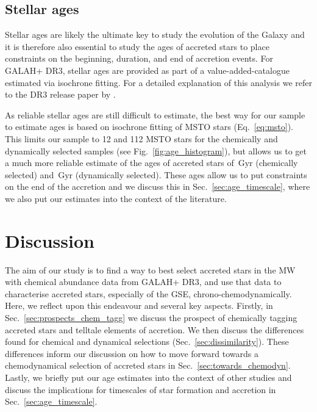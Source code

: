 \documentclass[fleqn,usenatbib]{mnras}
\newcommand{\Gyr}{\,\mathrm{Gyr}}	%
\begin{document}
\subsection{Stellar ages} \label{sec:gse_stellar_ages}

Stellar ages are likely the ultimate key to study the evolution of the Galaxy and it is therefore also essential to study the ages of accreted stars to place constraints on the beginning, duration, and end of accretion events. For GALAH+ DR3, stellar ages are provided as part of a value-added-catalogue estimated via isochrone fitting. For a detailed explanation of this analysis we refer to the DR3 release paper by \citet{Buder2021}.

As reliable stellar ages are still difficult to estimate, the best way for our sample to estimate ages is based on isochrone fitting of MSTO stars (Eq.~\ref{eq:msto}). This limits our sample to 12 and 112 MSTO stars for the chemically and dynamically selected samples (see Fig.~\ref{fig:age_histogram}), but allows us to get a much more reliable estimate of the ages of accreted stars of $\Gyr$ (chemically selected) and $\Gyr$ (dynamically selected). These ages allow us to put constraints on the end of the accretion and we discuss this in Sec.~\ref{sec:age_timescale}, where we also put our estimates into the context of the literature.

\section{Discussion} \label{sec:discussion}

The aim of our study is to find a way to best select accreted stars in the MW with chemical abundance data from GALAH+ DR3, and use that data to characterise accreted stars, especially of the GSE, chrono-chemodynamically. Here, we reflect upon this endeavour and several key aspects. Firstly, in Sec.~\ref{sec:prospects_chem_tagg} we discuss the prospect of chemically tagging accreted stars and telltale elements of accretion. We then discuss the differences found for chemical and dynamical selections (Sec.~\ref{sec:dissimilarity}). These differences inform our discussion on how to move forward towards a chemodynamical selection of accreted stars in Sec.~\ref{sec:towards_chemodyn}. Lastly, we briefly put our age estimates into the context of other studies and discuss the implications for timescales of star formation and accretion in Sec.~\ref{sec:age_timescale}.
\end{document}
